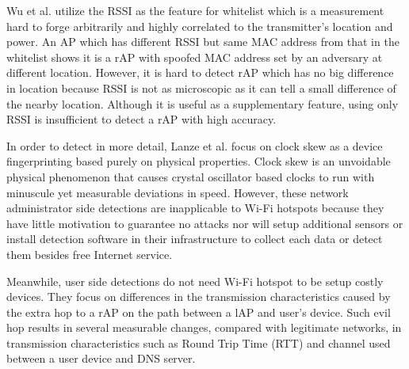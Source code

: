 \documentclass[conference]{IEEEtran}
\begin{document}
Wu et al. \cite{prapd} utilize the RSSI as the feature for whitelist which is a measurement hard to forge arbitrarily and highly correlated to the transmitter's location and power. 
An AP which has different RSSI but same MAC address from that in the whitelist shows it is a rAP with spoofed MAC address set by an adversary at different location.
However, it is hard to detect rAP which has no big difference in location because RSSI is not as microscopic as it can tell a small difference of the nearby location. 
Although it is useful as a supplementary feature, using only RSSI is insufficient to detect a rAP with high accuracy.

In order to detect in more detail, Lanze et al. \cite{clockskew} focus on clock skew as a device fingerprinting based purely on physical properties.
Clock skew is an unvoidable physical phenomenon that causes crystal oscillator based clocks to run with minuscule yet measurable deviations in speed.
However, these network administrator side detections are inapplicable to Wi-Fi hotspots because they have little motivation to guarantee no attacks nor will setup additional sensors or install detection software in their infrastructure to collect each data or detect them besides free Internet service.

Meanwhile, user side detections do not need Wi-Fi hotspot to be setup costly devices. 
They focus on differences in the transmission characteristics caused by the extra hop to a rAP on the path between a lAP and user's device. 
Such evil hop results in several measurable changes, compared with legitimate networks, in transmission characteristics such as Round Trip Time (RTT) and channel used between a user device and DNS server.
\end{document}
